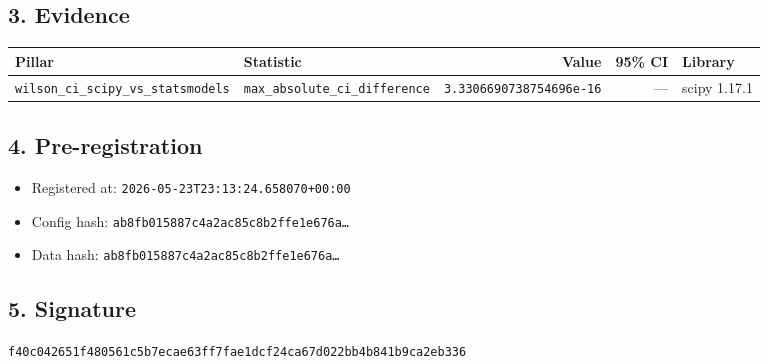 \documentclass{article}
\begin{document}
\subsection*{3. Evidence}
\begin{tabular}{llrrl}\toprule
\textbf{Pillar} & \textbf{Statistic} & \textbf{Value} & \textbf{95\% CI} & \textbf{Library} \\\midrule
\texttt{wilson\_ci\_scipy\_vs\_statsmodels} & \texttt{max\_absolute\_ci\_difference} & \texttt{3.3306690738754696e-16} & --- & scipy 1.17.1 \\
\bottomrule\end{tabular}
\subsection*{4. Pre-registration}
\begin{itemize}
\item Registered at: \texttt{2026-05-23T23:13:24.658070+00:00}
\item Config hash: \texttt{ab8fb015887c4a2ac85c8b2ffe1e676a\dots}
\item Data hash: \texttt{ab8fb015887c4a2ac85c8b2ffe1e676a\dots}
\end{itemize}
\subsection*{5. Signature}
\texttt{f40c042651f480561c5b7ecae63ff7fae1dcf24ca67d022bb4b841b9ca2eb336}\\
\end{document}
